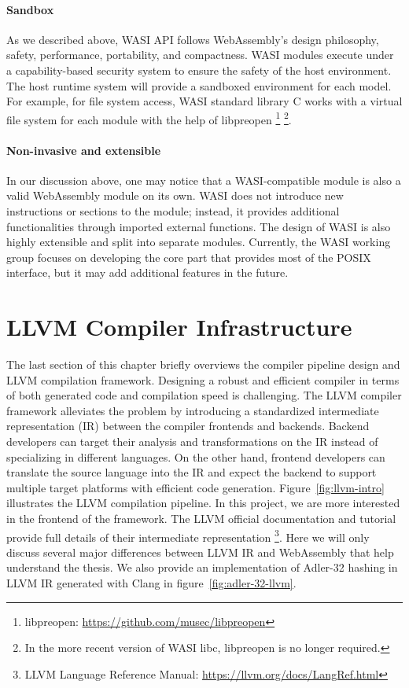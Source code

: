 \paragraph{Sandbox}
As we described above, WASI API follows WebAssembly's design philosophy, safety,
performance, portability, and compactness. WASI modules execute under a
capability-based security system to ensure the safety of the host environment.
The host runtime system will provide a sandboxed environment for each model. For
example, for file system access, WASI standard library C works with a virtual
file system for each module with the help of libpreopen \footnote{libpreopen:
  \url{https://github.com/musec/libpreopen}} \footnote{In the more recent
  version of WASI libc, libpreopen is no longer required.}.

\paragraph{Non-invasive and extensible}
In our discussion above, one may notice that a WASI-compatible module is also a
valid WebAssembly module on its own. WASI does not introduce new instructions
or sections to the module; instead, it provides additional functionalities
through imported external functions. The design of WASI is also highly
extensible and split into separate modules. Currently, the WASI working group
focuses on developing the core part that provides most of the POSIX interface,
but it may add additional features in the future.

\section{LLVM Compiler Infrastructure}

The last section of this chapter briefly overviews the compiler pipeline design
and LLVM compilation framework. Designing a robust and efficient compiler in
terms of both generated code and compilation speed is challenging. The LLVM
compiler framework \cite{llvm-thesis} alleviates the problem by introducing a
standardized intermediate representation (IR) between the compiler frontends and
backends. Backend developers can target their analysis and transformations on
the IR instead of specializing in different languages. On the other hand,
frontend developers can translate the source language into the IR and expect
the backend to support multiple target platforms with efficient code generation.
Figure~\ref{fig:llvm-intro} illustrates the LLVM compilation pipeline. In this
project, we are more interested in the frontend of the framework. The LLVM
official documentation and tutorial provide full details of their intermediate
representation \footnote{LLVM Language Reference Manual:
  \url{https://llvm.org/docs/LangRef.html}}. Here we will only discuss several
major differences between LLVM IR and WebAssembly that help understand the
thesis. We also provide an implementation of Adler-32 hashing in LLVM IR
generated with Clang in figure~\ref{fig:adler-32-llvm}.

